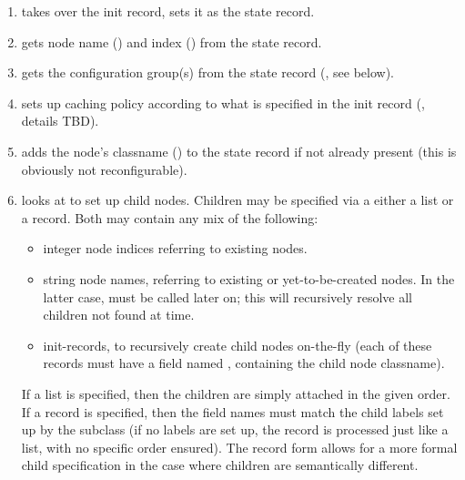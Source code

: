 \documentclass[10pt]{article}
\begin{document}
  \begin{enumerate}
  
  \item takes over the init record, sets it as the state record.
    
  \item gets node name () and index ()
        from the state record.

  \item gets the configuration group(s) from the state record 
    (, see below).

  \item sets up caching policy according to what is specified in the
    init record (, details TBD).
    
  \item adds the node's classname () to the state record if not
    already present (this is obviously not reconfigurable).

  \item looks at  to set up child nodes. Children may be specified
    via a either a list or a record. Both may contain any mix of the
    following:
    
    \begin{itemize}
      \item integer node indices referring to existing nodes.

      \item string node names, referring to existing or yet-to-be-created
        nodes. In the latter case,  must be called
        later on; this will recursively resolve all children not found at
         time.

      \item init-records, to recursively create child nodes on-the-fly (each of
        these records must have a field named , containing the child
        node classname).

    \end{itemize}

    If a list is specified, then the children are simply attached in the given
    order. If a record is specified, then the field names must match the child
    labels set up by the subclass (if no labels are set up, the record is
    processed just like a list, with no specific order ensured). The record
    form allows for a more formal child specification in the case where
    children are semantically different.

  \end{enumerate}
\end{document}
